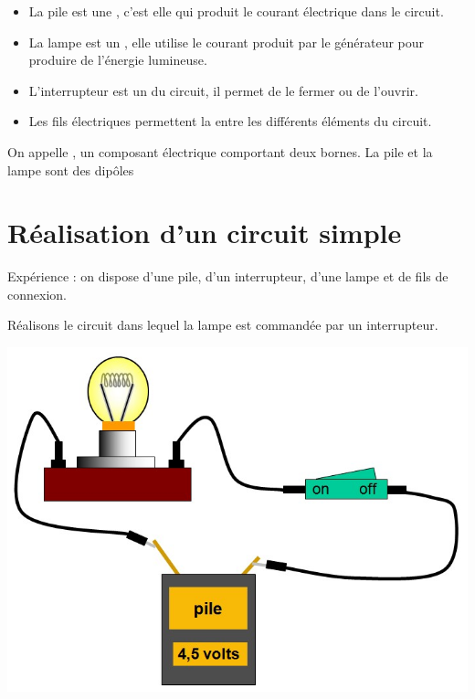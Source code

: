\documentclass[12pt,a4paper]{article}
\begin{document}
\begin{mybilan}
	\begin{itemize}
		\item La pile est une , c'est elle qui produit le courant électrique dans le circuit.
		\item La lampe est un , elle utilise le courant produit par le générateur pour produire de l'énergie lumineuse.
		\item L'interrupteur est un  du circuit, il permet de le fermer ou de l'ouvrir.
		\item Les fils électriques permettent la  entre les différents éléments du circuit.
		
	\end{itemize}

On appelle , un composant électrique comportant deux bornes. La pile et la lampe sont des dipôles

\end{mybilan}

\newpage 

\section{Réalisation d'un circuit simple}

Expérience : on dispose d'une pile, d'un interrupteur, d'une lampe et de fils de connexion.

Réalisons le circuit dans lequel la lampe est commandée par un interrupteur.

\begin{center}
	\includegraphics[scale=0.5]{img/circuitsimple}
\end{center}
\end{document}
